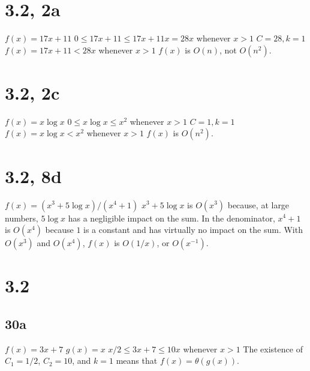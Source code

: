 \documentclass{article}
\title{Discrete Math: Problem Set #3}
\author{Jackie Luo}
\date{March 25, 2015}
\begin{document}
\maketitle

\section{3.2, 2a}
$f(x) = 17x + 11$
\newline
$0 \leq 17x + 11 \leq 17x + 11x = 28x$ whenever $x > 1$
\newline
$C = 28, k = 1$
\newline
$f(x) = 17x + 11 < 28x$ whenever $x > 1$
\newline
\newline
$f(x)$ is $O(n)$, not $O(n^2)$.

\section{3.2, 2c}
$f(x) = x \log x$
\newline
$0 \leq x \log x \leq x^2$ whenever $x > 1$
\newline
$C = 1, k = 1$
\newline
$f(x) = x \log x < x^2$ whenever $x > 1$
\newline
\newline
$f(x)$ is $O(n^2)$.

\section{3.2, 8d}
$f(x) = (x^3 + 5 \log x)/(x^4 + 1)$
\newline
$x^3 + 5 \log x$ is $O(x^3)$ because, at large numbers, $5 \log x$ has a negligible impact on the sum. In the denominator, $x^4 + 1$ is $O(x^4)$ because $1$ is a constant and has virtually no impact on the sum. With $O(x^3)$ and $O(x^4)$, $f(x)$ is $O(1/x)$, or $O(x^{-1})$.

\section{3.2}
\subsection{30a}
$f(x) = 3x + 7$
\newline
$g(x) = x$
\newline
$x/2 \leq 3x + 7 \leq 10x$ whenever $x > 1$
\newline
The existence of $C_{1} = 1/2$, $C_{2} = 10$, and $k = 1$ means that $f(x) = \theta (g(x))$.
\end{document}

